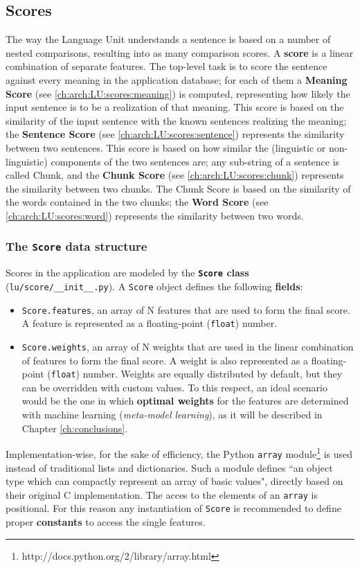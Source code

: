 \subsection{Scores}
The way the Language Unit understands a sentence is based on a number of nested comparisons, resulting into as many comparison scores. A \textbf{score} is a linear combination of separate features. The top-level task is to score the sentence against every meaning in the application database; for each of them a \textbf{Meaning Score} (see \ref{ch:arch:LU:scores:meaning}) is computed, representing how likely the input sentence is to be a realization of that meaning. This score is based on the similarity of the input sentence with the known sentences realizing the meaning; the \textbf{Sentence Score} (see \ref{ch:arch:LU:scores:sentence}) represents the similarity between two sentences. This score is based on how similar the (linguistic or non-linguistic) components of the two sentences are; any sub-string of a sentence is called Chunk, and the \textbf{Chunk Score} (see \ref{ch:arch:LU:scores:chunk}) represents the similarity between two chunks. The Chunk Score is based on the similarity of the words contained in the two chunks; the \textbf{Word Score} (see \ref{ch:arch:LU:scores:word}) represents the similarity between two words.

\subsubsection{The \texttt{Score} data structure}
Scores in the application are modeled by the \textbf{\texttt{Score} class} (\texttt{lu/score/\_\_init\_\_.py}). A \texttt{Score} object defines the following \textbf{fields}:
\begin{itemize}
	\item \texttt{Score.features}, an array of N features that are used to form the final score. A feature is represented as a floating-point (\texttt{float}) number.
	\item \texttt{Score.weights}, an array of N weights that are used in the linear combination of features to form the final score. A weight is also represented as a floating-point (\texttt{float}) number. Weights are equally distributed by default, but they can be overridden with custom values. To this respect, an ideal scenario would be the one in which \textbf{optimal weights} for the features are determined with machine learning (\emph{meta-model learning}), as it will be described in Chapter \ref{ch:conclusions}. %
\end{itemize}
Implementation-wise, for the sake of efficiency, the Python \texttt{array} module\footnote{http://docs.python.org/2/library/array.html} is used instead of traditional lists and dictionaries. Such a module defines ``an object type which can compactly represent an array of basic values", directly based on their original C implementation. The acces to the elements of an \texttt{array} is positional. For this reason any instantiation of \texttt{Score} is recommended to define proper \textbf{constants} to access the single features.

